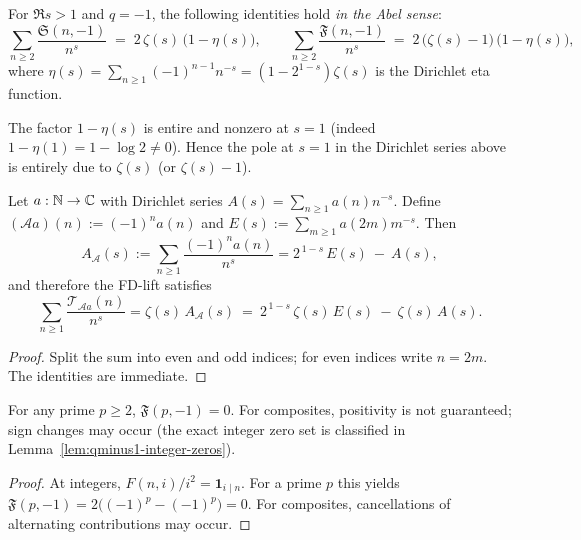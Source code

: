 \begin{proposition}\label{prop:qminus1-dirichlet}
For $\Re s>1$ and $q=-1$, the following identities hold \emph{in the Abel sense}:
\[
\sum_{n\ge2}\frac{\mathfrak S(n,-1)}{n^s}
\;=\;2\,\zeta(s)\,\bigl(1-\eta(s)\bigr),
\qquad
\sum_{n\ge2}\frac{\mathfrak F(n,-1)}{n^s}
\;=\;2\,\bigl(\zeta(s)-1\bigr)\,\bigl(1-\eta(s)\bigr),
\]
where $\eta(s)=\sum_{n\ge1}(-1)^{n-1}n^{-s}=(1-2^{1-s})\zeta(s)$ is the Dirichlet eta function.
\end{proposition}

\begin{corollary}[Behaviour at \(s=1\)]\label{cor:qminus1-s1}
The factor \(1-\eta(s)\) is entire and nonzero at \(s=1\) (indeed \(1-\eta(1)=1-\log2\neq0\)).
Hence the pole at \(s=1\) in the Dirichlet series above is entirely due to \(\zeta(s)\) (or \(\zeta(s)-1\)).
\end{corollary}

\begin{proposition}\label{prop:alternation-operator}
Let \(a:\mathbb{N}\to\mathbb{C}\) with Dirichlet series \(A(s)=\sum_{n\ge1}a(n)n^{-s}\). Define \((\mathcal A a)(n):=(-1)^n a(n)\) and \(E(s):=\sum_{m\ge1}a(2m)m^{-s}\).
Then
\[
A_{\mathcal A}(s):=\sum_{n\ge1}\frac{(-1)^n a(n)}{n^s}
= 2^{\,1-s}\,E(s)\ -\ A(s),
\]
and therefore the FD-lift satisfies
\[
\sum_{n\ge1}\frac{\mathcal T_{\mathcal A a}(n)}{n^s}
=\zeta(s)\,A_{\mathcal A}(s)\ =\ 2^{\,1-s}\,\zeta(s)\,E(s)\ -\ \zeta(s)\,A(s).
\]
\end{proposition}


\begin{proof}
Split the sum into even and odd indices; for even indices write \(n=2m\). The identities are immediate.
\end{proof}

\begin{lemma}\label{lem:qminus1-prime-zero}
For any prime \(p\ge2\),
\(\mathfrak F(p,-1)=0\).
For composites, positivity is not guaranteed; sign changes may occur (the exact integer zero set is classified in Lemma~\ref{lem:qminus1-integer-zeros}).
\end{lemma}

\begin{proof}
At integers, \(F(n,i)/i^2=\mathbf 1_{i\mid n}\). For a prime \(p\) this yields
\(\mathfrak F(p,-1)=2\bigl((-1)^p-(-1)^p\bigr)=0\).
For composites, cancellations of alternating contributions may occur.
\end{proof}

